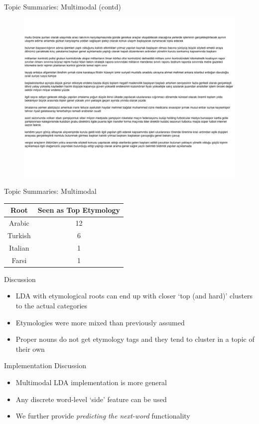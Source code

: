 \documentclass[pdf]{beamer}
\begin{document}
\begin{frame}{Topic Summaries: Multimodal (contd)}
\begin{figure}
\label{fig:sum22}
\includegraphics*[width=\textwidth]{topics2-2.jpeg}
\end{figure}
\end{frame}

\begin{frame}{Topic Summaries: Multimodal}
\begin{tabular}{c|c}
Root&Seen as Top Etymology\\
\hline
Arabic&12\\
Turkish&6\\
Italian&1\\
Farsi&1
\end{tabular}
\end{frame}

\begin{frame}{Discussion}
\begin{itemize}
\item LDA with etymological roots can end up with closer `top (and hard)' clusters to the actual categories
\item Etymologies were more mixed than previously assumed
\item Proper nouns do not get etymology tags and they tend to cluster in a topic of their own
\end{itemize}
\end{frame}

\begin{frame}{Implementation Discussion}
\begin{itemize}
\item Multimodal LDA implementation is more general
\item Any discrete word-level `side' feature can be used
\item We further provide \textit{predicting the next-word} functionality
\end{itemize}
\end{frame}
\end{document}
